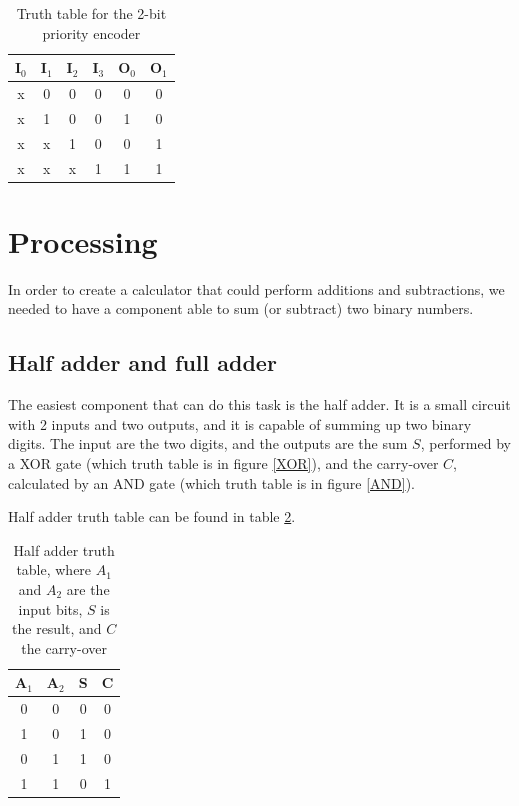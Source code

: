 \documentclass{article}
\begin{document}
\begin{table}[h]
  \centering
  \begin{tabular}{| c | c | c | c || c | c |}
  \hline
  I$_0$ & I$_1$ & I$_2$ & I$_3$ & O$_0$ & O$_1$ \\ \hline
  x & 0 & 0 & 0 & 0 & 0 \\ \hline
  x & 1 & 0 & 0 & 1 & 0 \\ \hline
  x & x & 1 & 0 & 0 & 1 \\ \hline
  x & x & x & 1 & 1 & 1 \\ \hline
  \end{tabular}
  \caption{Truth table for the 2-bit priority encoder}
  \label{Table_priority_encoder}
\end{table}

\clearpage









\section{Processing}

In order to create a calculator that could perform additions and subtractions, we needed to have a component able to sum (or subtract) two binary numbers.

\subsection{Half adder and full adder}

The easiest component that can do this task is the half adder. It is a small circuit with 2 inputs and two outputs, and it is capable of summing up two binary digits. The input are the two digits, and the outputs are the sum $S$, performed by a XOR gate (which truth table is in figure \ref{XOR}), and the carry-over $C$, calculated by an AND gate (which truth table is in figure \ref{AND}).

\vspace{3mm}

Half adder truth table can be found in table \ref{HalfAdderTT}.

\begin{table}[h]
  \centering
  \begin{tabular}{| c | c || c | c |}
  \hline
  A$_1$ & A$_2$ & S & C \\ \hline
  0 & 0 & 0 & 0 \\ \hline
  1 & 0 & 1 & 0 \\ \hline
  0 & 1 & 1 & 0 \\ \hline
  1 & 1 & 0 & 1 \\ \hline
  \end{tabular}
  \caption{Half adder truth table, where $A_1$ and $A_2$ are the input bits, $S$ is the result, and $C$ the carry-over}
  \label{HalfAdderTT}
\end{table}
\end{document}
